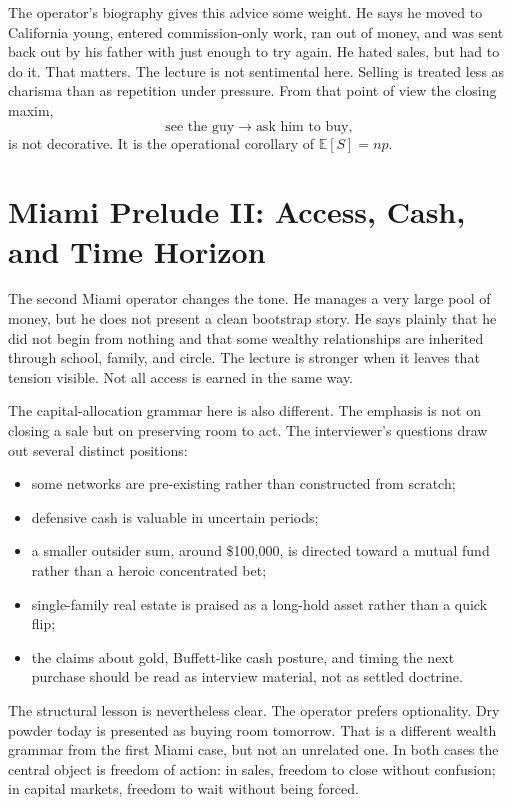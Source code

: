 The operator's biography gives this advice some weight. He says he moved to California young, entered commission-only work, ran out of money, and was sent back out by his father with just enough to try again. He hated sales, but had to do it. That matters. The lecture is not sentimental here. Selling is treated less as charisma than as repetition under pressure. From that point of view the closing maxim,
\[
\text{see the guy} \to \text{ask him to buy},
\]
is not decorative. It is the operational corollary of \(\mathbb{E}[S]=np\).

\section{Miami Prelude II: Access, Cash, and Time Horizon}

The second Miami operator changes the tone. He manages a very large pool of money, but he does not present a clean bootstrap story. He says plainly that he did not begin from nothing and that some wealthy relationships are inherited through school, family, and circle. The lecture is stronger when it leaves that tension visible. Not all access is earned in the same way.

The capital-allocation grammar here is also different. The emphasis is not on closing a sale but on preserving room to act. The interviewer's questions draw out several distinct positions:
\begin{itemize}
\item some networks are pre-existing rather than constructed from scratch;
\item defensive cash is valuable in uncertain periods;
\item a smaller outsider sum, around \$100{,}000, is directed toward a mutual fund rather than a heroic concentrated bet;
\item single-family real estate is praised as a long-hold asset rather than a quick flip;
\item the claims about gold, Buffett-like cash posture, and timing the next purchase should be read as interview material, not as settled doctrine.
\end{itemize}

The structural lesson is nevertheless clear. The operator prefers optionality. Dry powder today is presented as buying room tomorrow. That is a different wealth grammar from the first Miami case, but not an unrelated one. In both cases the central object is freedom of action: in sales, freedom to close without confusion; in capital markets, freedom to wait without being forced.

